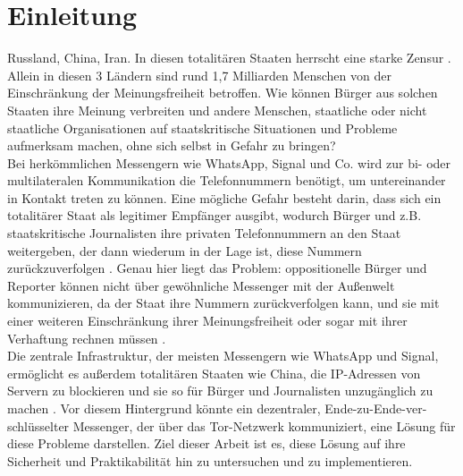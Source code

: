 \documentclass[a4paper,ngerman, headheight=28pt,12pt]{scrartcl}
\newcommand{\vcite}[1]{\cite[vgl.][]{#1}}
\begin{document}

\pagestyle{empty}
\tableofcontents
\clearpage
\pagestyle{plain}
%
\setcounter{page}{1}

\linenumbers{}
\modulolinenumbers[5]
\section{Einleitung}
Russland, China, Iran. In diesen totalitären Staaten herrscht eine starke Zensur \vcite{AmnReport}. Allein in diesen 3 Ländern sind rund 1,7 Milliarden Menschen von der Einschränkung der Meinungsfreiheit betroffen.
Wie können Bürger aus solchen Staaten ihre Meinung verbreiten und andere Menschen, staatliche oder nicht staatliche Organisationen auf staatskritische Situationen und Probleme aufmerksam machen, ohne sich selbst in Gefahr zu bringen? \\
Bei herkömmlichen Messengern wie WhatsApp, Signal und Co. wird zur bi- oder multilateralen Kommunikation die Telefonnummern benötigt, um untereinander in Kontakt treten zu können. Eine mögliche Gefahr besteht darin, dass sich ein totalitärer Staat als legitimer Empfänger ausgibt, wodurch Bürger und z.B. staatskritische Journalisten ihre privaten Telefonnummern an den Staat weitergeben, der dann wiederum in der Lage ist, diese Nummern zurückzuverfolgen \vcite{LocPolice}. Genau hier liegt das Problem: oppositionelle Bürger und Reporter können nicht über gewöhnliche Messenger mit der Außenwelt kommunizieren, da der Staat ihre Nummern zurückverfolgen kann, und sie mit einer weiteren Einschränkung ihrer Meinungsfreiheit oder sogar mit ihrer Verhaftung rechnen müssen \vcite{AmnReport}. \\
Die zentrale Infrastruktur, der meisten Messengern wie WhatsApp und Signal, ermöglicht es außerdem totalitären Staaten wie China, die IP-Adressen von Servern zu blockieren und sie so für Bürger und Journalisten unzugänglich zu machen \vcite{ChinaFirewall,CentralizedWhatsapp}.
Vor diesem Hintergrund könnte ein dezentraler, Ende-zu-Ende-ver-schlüsselter Messenger, der über das Tor-Netzwerk kommuniziert, eine Lösung für diese Probleme darstellen. Ziel dieser Arbeit ist es, diese Lösung auf ihre Sicherheit und Praktikabilität hin zu untersuchen und zu implementieren.\\
\end{document}
